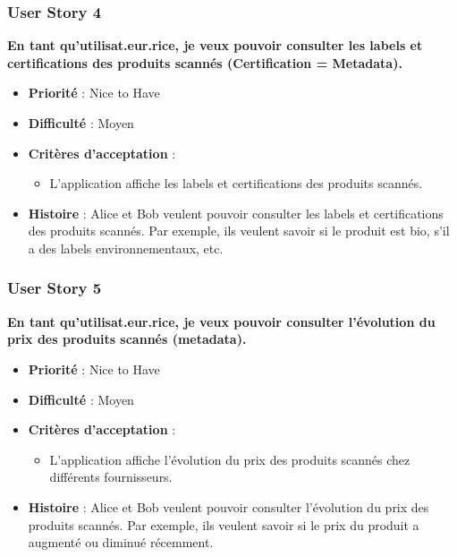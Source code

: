 \subsubsection{User Story 4}

\textbf{En tant qu'utilisat.eur.rice, je veux pouvoir consulter les labels et certifications des produits scannés (Certification = Metadata).}

\begin{itemize}[noitemsep]
    \item \textbf{Priorité} : Nice to Have
    \item \textbf{Difficulté} : Moyen
    \item \textbf{Critères d'acceptation} :
          \begin{itemize}[noitemsep]
              \item L'application affiche les labels et certifications des produits scannés.
          \end{itemize}
    \item \textbf{Histoire} : Alice et Bob veulent pouvoir consulter les labels et certifications des produits scannés. Par exemple, ils veulent savoir si le produit est bio, s'il a des labels environnementaux, etc.
\end{itemize}

\subsubsection{User Story 5}

\textbf{En tant qu'utilisat.eur.rice, je veux pouvoir consulter l'évolution du prix des produits scannés (metadata).}

\begin{itemize}[noitemsep]
    \item \textbf{Priorité} : Nice to Have
    \item \textbf{Difficulté} : Moyen
    \item \textbf{Critères d'acceptation} :
          \begin{itemize}[noitemsep]
              \item L'application affiche l'évolution du prix des produits scannés chez différents fournisseurs.
          \end{itemize}
    \item \textbf{Histoire} : Alice et Bob veulent pouvoir consulter l'évolution du prix des produits scannés. Par exemple, ils veulent savoir si le prix du produit a augmenté ou diminué récemment.
\end{itemize}


